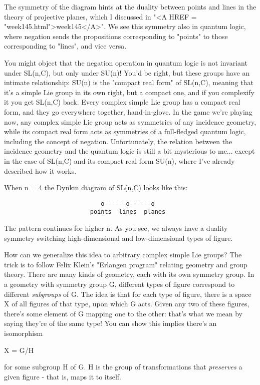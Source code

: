 The symmetry of the diagram hints at the duality between points and
lines in the theory of projective planes, which I discussed in "<A
HREF = "week145.html">week145</A>".  We see this symmetry also in
quantum logic, where negation sends the propositions corresponding to
"points" to those corresponding to "lines", and vice
versa.

You might object that the negation operation in quantum logic is not
invariant under SL(n,C), but only under SU(n)!  You'd be right, but
these groups have an intimate relationship: SU(n) is the "compact real
form" of SL(n,C), meaning that it's a simple Lie group in its own right,
but a compact one, and if you complexify it you get SL(n,C) back. 
Every complex simple Lie group has a compact real form, and they go
everywhere together, hand-in-glove.  In the game we're playing now, any
complex simple Lie group acts as symmetries of any incidence geometry,
while its compact real form acts as symmetries of a full-fledged quantum
logic, including the concept of negation.   Unfortunately, the relation
between the incidence geometry and the quantum logic is still a bit
mysterious to me... except in the case of SL(n,C) and its compact real 
form SU(n), where I've already described how it works.

When n = 4 the Dynkin diagram of SL(n,C) looks like this:

\begin{verbatim}
                           o------o------o
                        points  lines  planes       
\end{verbatim}
    
The pattern continues for higher n.  As you see, we always have a
duality symmetry switching high-dimensional and low-dimensional types
of figure.

How can we generalize this idea to arbitrary complex simple Lie groups?
The trick is to follow Felix Klein's "Erlangen program"
relating geometry and group theory.  There are many kinds of geometry,
each with its own symmetry group.  In a geometry with symmetry group G,
different types of figure correspond to different \emph{subgroups} of
G.  The idea is that for each type of figure, there is a space X of all
figures of that type, upon which G acts.  Given any two of these
figures, there's some element of G mapping one to the other: that's what
we mean by saying they're of the same type!  You can show this implies
there's an isomorphism

X = G/H

for some subgroup H of G.  H is the group of transformations
that \emph{preserves} a given figure - that is, maps it to itself.

